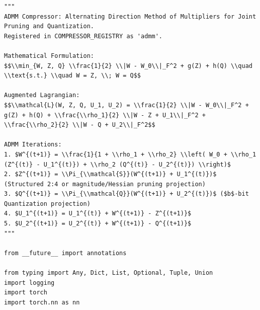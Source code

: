 \begin{lstlisting}
"""
ADMM Compressor: Alternating Direction Method of Multipliers for Joint Pruning and Quantization.
Registered in COMPRESSOR_REGISTRY as 'admm'.

Mathematical Formulation:
$$\\min_{W, Z, Q} \\frac{1}{2} \\|W - W_0\\|_F^2 + g(Z) + h(Q) \\quad \\text{s.t.} \\quad W = Z, \\; W = Q$$

Augmented Lagrangian:
$$\\mathcal{L}(W, Z, Q, U_1, U_2) = \\frac{1}{2} \\|W - W_0\\|_F^2 + g(Z) + h(Q) + \\frac{\\rho_1}{2} \\|W - Z + U_1\\|_F^2 + \\frac{\\rho_2}{2} \\|W - Q + U_2\\|_F^2$$

ADMM Iterations:
1. $W^{(t+1)} = \\frac{1}{1 + \\rho_1 + \\rho_2} \\left( W_0 + \\rho_1 (Z^{(t)} - U_1^{(t)}) + \\rho_2 (Q^{(t)} - U_2^{(t)}) \\right)$
2. $Z^{(t+1)} = \\Pi_{\\mathcal{S}}(W^{(t+1)} + U_1^{(t)})$ (Structured 2:4 or magnitude/Hessian pruning projection)
3. $Q^{(t+1)} = \\Pi_{\\mathcal{Q}}(W^{(t+1)} + U_2^{(t)})$ ($b$-bit Quantization projection)
4. $U_1^{(t+1)} = U_1^{(t)} + W^{(t+1)} - Z^{(t+1)}$
5. $U_2^{(t+1)} = U_2^{(t)} + W^{(t+1)} - Q^{(t+1)}$
"""

from __future__ import annotations

from typing import Any, Dict, List, Optional, Tuple, Union
import logging
import torch
import torch.nn as nn


\end{lstlisting}
